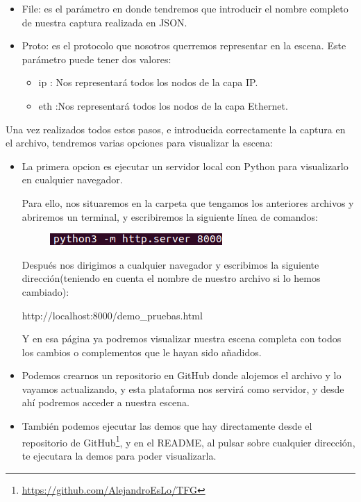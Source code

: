 \documentclass[a4paper, 12pt]{book}
\begin{document}
\begin{itemize}
    \item File: es el parámetro en donde tendremos que introducir el nombre completo de nuestra captura realizada en JSON.
    \item Proto: es el protocolo que nosotros querremos representar en la escena. Este parámetro puede tener dos valores:
    \begin{itemize}
    \item ip : Nos representará todos los nodos de la capa IP.
    \item eth :Nos representará todos los nodos de la capa Ethernet.
    \end{itemize}
\end{itemize}

Una vez realizados todos estos pasos, e introducida correctamente la captura en el archivo, tendremos varias opciones para visualizar la escena: 

\begin{itemize}
    \item La primera opcion es ejecutar un servidor local con Python para visualizarlo en cualquier navegador.

Para ello, nos situaremos en la carpeta que tengamos los anteriores archivos y abriremos un terminal, y escribiremos la siguiente línea de comandos:

\begin{figure}[h]
\centering
    \includegraphics[scale=0.7]{img/server_python.png}
\end{figure}

Después nos dirigimos a cualquier navegador y escribimos la siguiente dirección(teniendo en cuenta el nombre de nuestro archivo si lo hemos cambiado):

\begin{center}
http://localhost:8000/demo\_pruebas.html
\end{center}

Y en esa página ya podremos visualizar nuestra escena completa con todos los cambios o complementos que le hayan sido añadidos.

\item Podemos crearnos un repositorio en GitHub donde alojemos el archivo y lo vayamos actualizando, y esta plataforma nos servirá como servidor, y desde ahí podremos acceder a nuestra escena.

\item También podemos ejecutar las demos que hay directamente desde el repositorio de GitHub\footnote{\url{https://github.com/AlejandroEsLo/TFG}}, y en el README, al pulsar sobre cualquier dirección, te ejecutara la demos para poder visualizarla.

\end{itemize}
\end{document}
